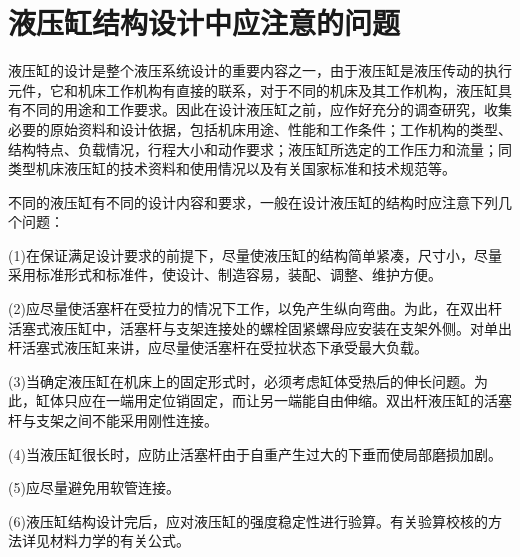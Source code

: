 \section{液压缸结构设计中应注意的问题}
    液压缸的设计是整个液压系统设计的重要内容之一，由于液压缸是液压传动的执行元件，它和机床工作机构有直接的联系，对于不同的机床及其工作机构，液压缸具有不同的用途和工作要求。因此在设计液压缸之前，应作好充分的调查研究，收集必要的原始资料和设计依据，包括机床用途、性能和工作条件；工作机构的类型、结构特点、负载情况，行程大小和动作要求；液压缸所选定的工作压力和流量；同类型机床液压缸的技术资料和使用情况以及有关国家标准和技术规范等。

    不同的液压缸有不同的设计内容和要求，一般在设计液压缸的结构时应注意下列几个问题：

(1)在保证满足设计要求的前提下，尽量使液压缸的结构简单紧凑，尺寸小，尽量采用标准形式和标准件，使设计、制造容易，装配、调整、维护方便。

(2)应尽量使活塞杆在受拉力的情况下工作，以免产生纵向弯曲。为此，在双出杆活塞式液压缸中，活塞杆与支架连接处的螺栓固紧螺母应安装在支架外侧。对单出杆活塞式液压缸来讲，应尽量使活塞杆在受拉状态下承受最大负载。

(3)当确定液压缸在机床上的固定形式时，必须考虑缸体受热后的伸长问题。为此，缸体只应在一端用定位销固定，而让另一端能自由伸缩。双出杆液压缸的活塞杆与支架之间不能采用刚性连接。

(4)当液压缸很长时，应防止活塞杆由于自重产生过大的下垂而使局部磨损加剧。

(5)应尽量避免用软管连接。

(6)液压缸结构设计完后，应对液压缸的强度稳定性进行验算。有关验算校核的方法详见材料力学的有关公式。
